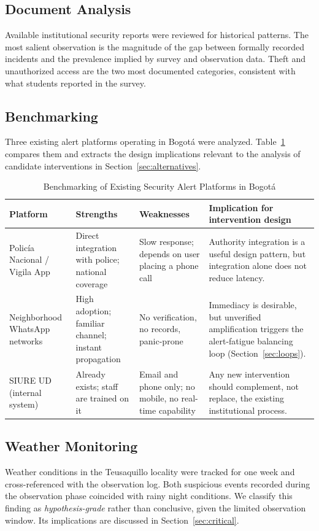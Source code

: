 \documentclass[conference]{IEEEtran}
\begin{document}
\subsection{Document Analysis}
Available institutional security reports were reviewed for historical
patterns. The most salient observation is the magnitude of the gap
between formally recorded incidents and the prevalence implied by
survey and observation data. Theft and unauthorized access are the
two most documented categories, consistent with what students
reported in the survey.

\subsection{Benchmarking}
Three existing alert platforms operating in Bogot\'a were analyzed.
Table~\ref{tab:bench} compares them and extracts the design
implications relevant to the analysis of candidate interventions in
Section~\ref{sec:alternatives}.

\begin{table}[t]
\caption{Benchmarking of Existing Security Alert Platforms in Bogot\'a}
\label{tab:bench}
\centering
\renewcommand{\arraystretch}{1.2}
\begin{tabular}{p{3.0cm}p{4.3cm}p{4.3cm}p{5.2cm}}
\toprule
\textbf{Platform} & \textbf{Strengths} & \textbf{Weaknesses} & \textbf{Implication for intervention design} \\
\midrule
Polic\'ia Nacional / Vigila App & Direct integration with police; national coverage & Slow response; depends on user placing a phone call & Authority integration is a useful design pattern, but integration alone does not reduce latency. \\
Neighborhood WhatsApp networks & High adoption; familiar channel; instant propagation & No verification, no records, panic-prone & Immediacy is desirable, but unverified amplification triggers the alert-fatigue balancing loop (Section~\ref{sec:loops}). \\
SIURE UD (internal system) & Already exists; staff are trained on it & Email and phone only; no mobile, no real-time capability & Any new intervention should complement, not replace, the existing institutional process. \\
\bottomrule
\end{tabular}
\end{table}

\subsection{Weather Monitoring}
Weather conditions in the Teusaquillo locality were tracked for one
week and cross-referenced with the observation log. Both suspicious
events recorded during the observation phase coincided with rainy
night conditions. We classify this finding as \emph{hypothesis-grade}
rather than conclusive, given the limited observation window. Its
implications are discussed in Section~\ref{sec:critical}.
\end{document}
